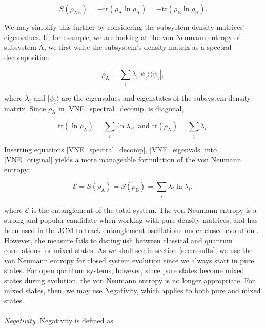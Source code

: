 \documentclass[11pt]{article}
\begin{document}
\begin{equation} \label{VNE_original}
    S(\rho_{\scriptscriptstyle \text{AB}}) = -\text{tr}(\rho_{\scriptscriptstyle \text{A}}\ln\rho_{\scriptscriptstyle \text{A}}) = -\text{tr}(\rho_{\scriptscriptstyle \text{B}}\ln\rho_{\scriptscriptstyle \text{B}}).
\end{equation}

We may simplify this further by considering the subsystem density matrices' eigenvalues. If, for example, we are looking at the von Neumann entropy of subsystem A, we first write the subsystem's density matrix as a spectral decomposition:

\begin{equation} \label{VNE_spectral_decomp}
    \rho_{\scriptscriptstyle \text{A}} = \sum_i \lambda_i|\psi_i\rangle\langle\psi_i|, 
\end{equation}

where $\lambda_i$ and $|\psi_i\rangle$ are the eigenvalues and eigenstates of the subsystem density matrix. Since $\rho_{\scriptscriptstyle \text{A}}$ in \eqref{VNE_spectral_decomp} is diagonal,

\begin{equation} \label{VNE_eigenvals}
\text{tr}(\ln\rho_{\scriptscriptstyle \text{A}}) = \sum_i \ln\lambda_i,\text{ and } \text{tr}(\rho_{\scriptscriptstyle \text{A}}) = \sum_i \lambda_i.
\end{equation}

Inserting equations \eqref{VNE_spectral_decomp}, \eqref{VNE_eigenvals} into \eqref{VNE_original} yields a more manageable formulation of the von Neumann entropy:

\begin{equation}
    \mathcal{E} = S(\rho_{\scriptscriptstyle \text{A}}) = S(\rho_{\scriptscriptstyle \text{B}}) = \sum_i \lambda_i\ln\lambda_i,
\end{equation}

where $\mathcal{E}$ is the entanglement of the total system. The von Neumann entropy is a strong and popular candidate when working with pure density matrices, and has been used in the JCM to track entanglement oscillations under closed evolution \cite{Entanglement2009-REE_VNapplied}. However, the measure fails to distinguish between classical and quantum correlations for mixed states. As we shall see in section \ref{sec:results}, we use the von Neumann entropy for closed system evolution since we always start in pure states. For open quantum systems, however, since pure states become mixed states during evolution, the von Neumann entropy is no longer appropriate. For mixed states, then, we may use Negativity, which applies to both pure and mixed states. \\
\\
\textit{Negativity}. Negativity is defined as
\end{document}
